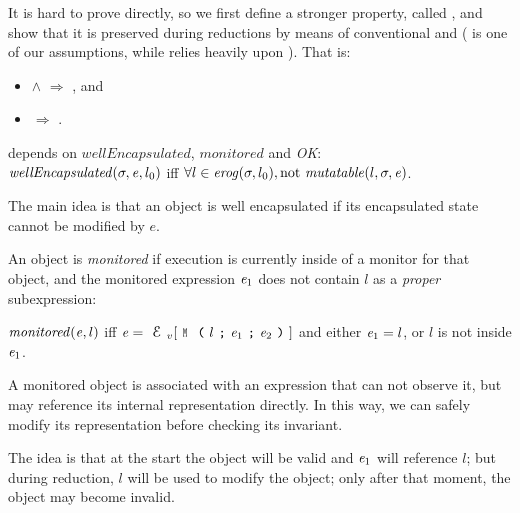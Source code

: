It is hard to prove  directly,
so we first define a stronger property,
called , and
show that it is preserved during reductions by means of conventional
 and  ( is one of our assumptions,
while  relies heavily upon ).
That is:
\begin{itemize}
\item {} $\wedge$  $\Rightarrow$ , and
\item {} $\Rightarrow$ .
\end{itemize}


\saveSpace
{} depends on
$\mathit{wellEncapsulated}$, $\mathit{monitored}$
and \emph{OK}:\\
\loseSpace%
\indent $\mathit{wellEncapsulated}(\sigma,{\mathit{e}},l_0)$ iff
$\forall l \in \mathit{erog}(\sigma,l_0), \text{not}\ \mathit{mutatable}(l,\sigma,{\mathit{e}})$.\loseSpace

\noindent The main idea is that an object is well encapsulated if its encapsulated state cannot be
modified by $e$.

An object is \emph{monitored} if execution
is currently inside of a monitor for that object, and
the monitored expression ${\mathit{e}}_1$ does not
contain $l$ as a \emph{proper} subexpression:

\indent $\mathit{monitored}({\mathit{e}},l)$ iff
$\e=\ctx_v[\M{l}{\e_1}{\e_2}]$ and either ${\mathit{e}}_1=l$, or $l$ is not inside ${\mathit{e}}_1$.\loseSpace

\noindent A monitored object is associated with an expression that can not observe it, but may
reference its internal representation directly.
In this way, we can safely modify its representation before checking its invariant.

The idea is that at the start the object will be valid and ${\mathit{e}}_1$ will reference $l$;
but during reduction, $l$ will be used to
modify the object; only after that moment, the object may become invalid.


